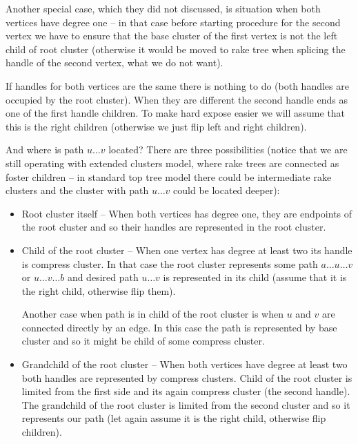Another special case, which they did not discussed, is situation when both
vertices have degree one -- in that case before starting procedure for the
second vertex we have to ensure that the base cluster of the first vertex is not
the left child of root cluster (otherwise it would be moved to rake tree when
splicing the handle of the second vertex, what we do not want).

If handles for both vertices are the same there is nothing to do (both handles
are occupied by the root cluster). When they are different the second handle
ends as one of the first handle children. To make hard expose easier we will
assume that this is the right children (otherwise we just flip left and right
children).

And where is path $u\dots v$ located? There are three possibilities (notice that
we are still operating with extended clusters model, where rake trees are
connected as foster children -- in standard top tree model there could be
intermediate rake clusters and the cluster with path $u\dots v$ could be located
deeper):

\begin{itemize}

\item Root cluster itself -- When both vertices has degree one, they are endpoints
of the root cluster and so their handles are represented in the root cluster.

\item Child of the root cluster -- When one vertex has degree at least two its
handle is compress cluster. In that case the root cluster represents some path
$a\dots u\dots v$ or $u\dots v\dots b$ and desired path $u\dots v$ is
represented in its child (assume that it is the right child, otherwise flip them).

Another case when path is in child of the root cluster is when $u$ and $v$ are
connected directly by an edge. In this case the path is represented by base cluster
and so it might be child of some compress cluster.

\item Grandchild of the root cluster -- When both vertices have degree at least
two both handles are represented by compress clusters. Child of the root cluster
is limited from the first side and its again compress cluster (the second handle).
The grandchild of the root cluster is limited from the second cluster and so it
represents our path (let again assume it is the right child, otherwise flip
children).

\end{itemize}

